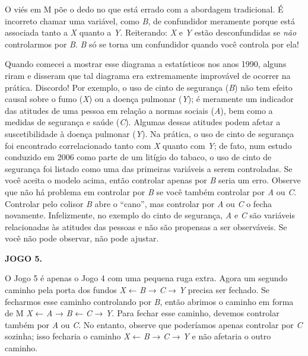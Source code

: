 \documentclass[11pt,a5paper,twoside]{book}
\begin{document}
O viés em M põe o dedo no que está errado com a abordagem tradicional. É incorreto chamar uma variável, como \textit{B}, de confundidor meramente porque está associada tanto a \textit{X} quanto a \textit{Y}. Reiterando: \textit{X} e \textit{Y} estão desconfundidas se \textit{não} controlarmos por \textit{B}. \textit{B} só se torna um confundidor quando você controla por ela!

Quando comecei a mostrar esse diagrama a estatísticos nos anos 1990, alguns riram e disseram que tal diagrama era extremamente improvável de ocorrer na prática. Discordo! Por exemplo, o uso de cinto de segurança (\textit{B}) não tem efeito causal sobre o fumo (\textit{X}) ou a doença pulmonar (\textit{Y}); é meramente um indicador das atitudes de uma pessoa em relação a normas sociais (\textit{A}), bem como a medidas de segurança e saúde (\textit{C}). Algumas dessas atitudes podem afetar a suscetibilidade à doença pulmonar (\textit{Y}). Na prática, o uso de cinto de segurança foi encontrado correlacionado tanto com \textit{X} quanto com \textit{Y}; de fato, num estudo conduzido em 2006 como parte de um litígio do tabaco, o uso de cinto de segurança foi listado como uma das primeiras variáveis a serem controladas. Se você aceita o modelo acima, então controlar apenas por \textit{B} seria um erro. Observe que não há problema em controlar por \textit{B} se você também controlar por \textit{A} ou \textit{C}. Controlar pelo colisor \textit{B} abre o “cano”, mas controlar por \textit{A} ou \textit{C} o fecha novamente. Infelizmente, no exemplo do cinto de segurança, \textit{A} e \textit{C} são variáveis relacionadas às atitudes das pessoas e não são propensas a ser observáveis. Se você não pode observar, não pode ajustar.

\textbf{JOGO 5.}

O Jogo 5 é apenas o Jogo 4 com uma pequena ruga extra. Agora um segundo caminho pela porta dos fundos \textit{X} ← \textit{B} → \textit{C} → \textit{Y} precisa ser fechado. Se fecharmos esse caminho controlando por \textit{B}, então abrimos o caminho em forma de M \textit{X} ← \textit{A} → \textit{B} ← \textit{C} → \textit{Y}. Para fechar esse caminho, devemos controlar também por \textit{A} ou \textit{C}. No entanto, observe que poderíamos apenas controlar por \textit{C} sozinha; isso fecharia o caminho \textit{X} ← \textit{B} → \textit{C} → \textit{Y} e não afetaria o outro caminho.
\end{document}
